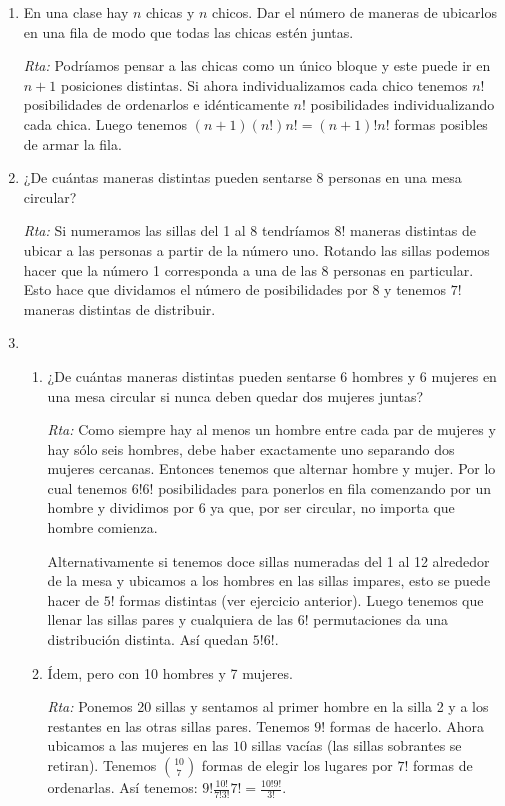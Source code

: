 \documentclass[12pt,spanish,makeidx]{amsbook}
\begin{document}
\begin{enumerate}
\medskip

\item En una clase hay $n$ chicas y $n$ chicos. Dar el número de maneras de ubicarlos en una fila de modo que todas las chicas estén juntas.

\noindent\textit{Rta:} Podríamos pensar a las chicas como un único bloque y este puede ir en $n+1$ posiciones distintas. Si ahora individualizamos cada chico tenemos $n!$ posibilidades de ordenarlos e idénticamente $n!$ posibilidades individualizando cada chica. Luego tenemos $(n+1)(n!)n!=(n+1)!n!$ formas posibles de armar la fila.

\medskip

\item ¿De cuántas maneras distintas pueden sentarse 8 personas en una mesa circular?

\noindent\textit{Rta:} Si numeramos las sillas del 1 al 8 tendríamos $8!$ maneras distintas de ubicar a las personas a partir de la número uno. Rotando las sillas podemos hacer que la número 1 corresponda a una de las 8 personas en particular. Esto hace que dividamos el número de posibilidades por 8 y tenemos $7!$ maneras distintas de distribuir.

\medskip

\item 
\begin{enumerate}
\item 
¿De cuántas maneras distintas pueden sentarse 6 hombres y 6 mujeres en una
mesa circular si nunca deben quedar dos mujeres juntas?

\noindent\textit{Rta:} Como siempre hay al menos un hombre entre cada par de mujeres y hay sólo seis hombres, debe haber exactamente uno separando dos mujeres cercanas. Entonces tenemos que alternar hombre y mujer. Por lo cual tenemos $6!6!$ posibilidades para ponerlos en fila comenzando por un hombre y dividimos por 6 ya que, por ser circular, no importa que hombre comienza. 

Alternativamente si tenemos doce sillas numeradas del 1 al 12 alrededor de la mesa y ubicamos a los hombres en las sillas impares, esto se puede hacer de $5!$ formas distintas (ver ejercicio anterior). Luego tenemos que llenar las sillas pares y cualquiera de las $6!$ permutaciones da una distribución distinta. Así quedan $5!6!$.

\item Ídem, pero con 10 hombres y 7 mujeres.

\noindent\textit{Rta:}  Ponemos 20 sillas y sentamos al primer  hombre en la silla 2 y  a los restantes en las otras sillas pares. Tenemos $9!$ formas de hacerlo. Ahora ubicamos a las mujeres en las $10$ sillas vacías (las sillas sobrantes se retiran). Tenemos $\binom{10}{7}$ formas de elegir los lugares por $7!$ formas de ordenarlas. Así tenemos: $\displaystyle 9! \frac{10!}{7!3!} 7!=\frac{10!9!}{3!}$.


\end{enumerate}
\end{enumerate}
\end{document}
